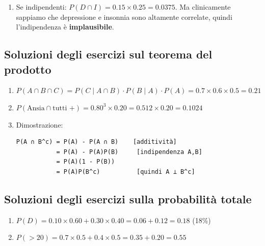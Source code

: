 \documentclass[
  italian,
  letterpaper,
  a4paper,
  11pt,
  open=any]{scrbook}
\providecommand{\tightlist}{%
  \setlength{\itemsep}{0pt}\setlength{\parskip}{0pt}}
\theoremstyle{plain}
\theoremstyle{definition}
\theoremstyle{definition}
\theoremstyle{remark}
\begin{document}
\begin{tcolorbox}
\begin{enumerate}
  \begin{enumerate}
  \def\labelenumii{\alph{enumii}.}
  \tightlist
  \item
    Tabella con \(A\) = \{TT, TC\}, \(B\) = \{TT, TC, CT\}
  \item
    \(P(A \mid B) = P(\{TT, TC\}) / P(B) = (1/2) / (3/4) = 2/3\)
  \item
    \(P(A) = 1/2 \neq 2/3 = P(A \mid B)\). NON indipendenti.
  \end{enumerate}
\item
  Se indipendenti: \(P(D \cap I) = 0.15 \times 0.25 = 0.0375\). Ma
  clinicamente sappiamo che depressione e insonnia sono altamente
  correlate, quindi l'indipendenza è \textbf{implausibile}.
\end{enumerate}

\subsection*{Soluzioni degli esercizi sul teorema del
prodotto}\label{soluzioni-degli-esercizi-sul-teorema-del-prodotto}

\begin{enumerate}
\def\labelenumi{\arabic{enumi}.}
\setcounter{enumi}{11}
\item
  \(P(A \cap B \cap C) = P(C \mid A \cap B) \cdot P(B \mid A) \cdot P(A) = 0.7 \times 0.6 \times 0.5 = 0.21\)
\item
  \(P(\text{Ansia} \cap \text{tutti +}) = 0.80^3 \times 0.20 = 0.512 \times 0.20 = 0.1024\)
\item
  Dimostrazione:

\begin{verbatim}
P(A ∩ B^c) = P(A) - P(A ∩ B)    [additività]
           = P(A) - P(A)P(B)     [indipendenza A,B]
           = P(A)(1 - P(B))
           = P(A)P(B^c)          [quindi A ⊥ B^c]
\end{verbatim}
\end{enumerate}

\subsection*{Soluzioni degli esercizi sulla probabilità
totale}\label{soluzioni-degli-esercizi-sulla-probabilituxe0-totale}

\begin{enumerate}
\def\labelenumi{\arabic{enumi}.}
\setcounter{enumi}{14}
\item
  \(P(D) = 0.10 \times 0.60 + 0.30 \times 0.40 = 0.06 + 0.12 = 0.18\)
  (18\%)
\item
  \(P(>20) = 0.7 \times 0.5 + 0.4 \times 0.5 = 0.35 + 0.20 = 0.55\)
\end{enumerate}


\end{tcolorbox}
\end{document}

